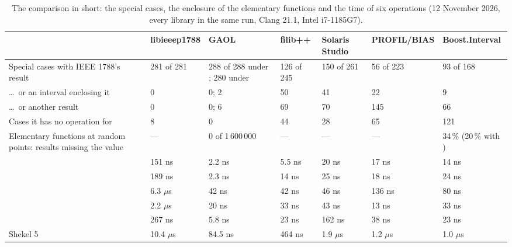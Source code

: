 \begin{table}[htbp]
\centering\footnotesize
\setlength{\tabcolsep}{3pt}
\caption[The comparison in short]{The comparison in short: the special cases, the enclosure of the elementary functions and the time of six operations (12 November 2026, every library in the same run, Clang 21.1, Intel i7-1185G7).} \label{tab:computing-inshort}
\begin{tabular}{|L{2.15cm}|L{1.5cm}|L{2.2cm}|L{1.3cm}|L{1.6cm}|L{1.7cm}|
  L{2.0cm}|}
\hline
& \textbf{libieee\allowbreak p1788} & \textbf{GAOL} & \textbf{filib++}
& \textbf{Solaris Studio} & \textbf{PROFIL/\allowbreak BIAS}
& \textbf{Boost.\allowbreak Interval} \\
\hline
Special cases with IEEE 1788's result & 281 of 281 & 288 of 288 under
; 280 under  & 126 of 245 & 150 of 261
& 56 of 223 & 93 of 168 \\
\ldots\ or an interval enclosing it & 0 & 0; 2 & 50 & 41 & 22 & 9 \\
\ldots\ or another result & 0 & 0; 6 & 69 & 70 & 145 & 66 \\
Cases it has no operation for & 8 & 0 & 44 & 28 & 65 & 121 \\
\hline
Elementary functions at random points: results missing the value & ---
& 0 of 1\,600\,000 & --- & --- & --- & 34\,\% (20\,\% with
\allowbreak{}) \\
\hline
{} & 151 ns & 2.2 ns & 5.5 ns & 20 ns & 17 ns & 14 ns \\
 & 189 ns & 2.3 ns & 14 ns & 25 ns & 18 ns & 24 ns \\
 & 6.3 $\mu$s & 42 ns & 42 ns & 46 ns & 136 ns & 80 ns \\
 & 2.2 $\mu$s & 20 ns & 33 ns & 43 ns & 13 ns & 33 ns \\
 & 267 ns & 5.8 ns & 23 ns & 162 ns & 38 ns & 23 ns \\
Shekel 5 & 10.4 $\mu$s & 84.5 ns & 464 ns & 1.9 $\mu$s & 1.2 $\mu$s & 1.0 $\mu$s \\
\hline
\end{tabular}

\end{table}

